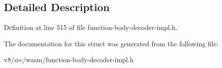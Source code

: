 \subsection{Detailed Description}


Definition at line 515 of file function-\/body-\/decoder-\/impl.\+h.



The documentation for this struct was generated from the following file\+:\begin{DoxyCompactItemize}
\item 
v8/src/wasm/function-\/body-\/decoder-\/impl.\+h\end{DoxyCompactItemize}
